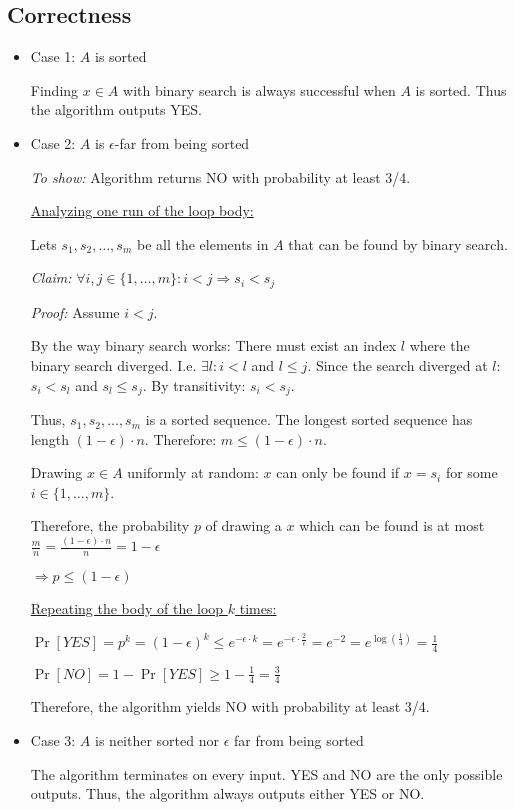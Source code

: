 \subsection*{Correctness}

\begin{itemize}
    \item Case 1: $A$ is sorted
    
    Finding $x \in A$ with binary search is always successful when $A$ is sorted. Thus the algorithm outputs YES. 
    
    \item Case 2: $A$ is $\epsilon$-far from being sorted
    
    \textit{To show:}  Algorithm returns NO with probability at least 3/4. 
    
    \underline{Analyzing one run of the loop body:}
        
    Lets $s_1, s_2,\dots,s_m$ be all the elements in $A$ that can be found by binary search.
    
    \textit{Claim:} $\forall i,j \in \{1,\dots,m\} : i < j \Rightarrow s_i < s_j$
    
    \textit{Proof:} Assume  $i < j$.
    
    By the way binary search works: There must exist an index $l$ where the binary search diverged. I.e. $\exists l : i < l$ and $l \leq j$.
    Since the search diverged at $l$: $s_i < s_l$ and $s_l \leq s_j$. By transitivity: $s_i < s_j$.
    
    Thus, $s_1, s_2,\dots,s_m$ is a sorted sequence. The longest sorted sequence has length $(1 - \epsilon) \cdot n$. Therefore: $m \leq (1 - \epsilon) \cdot n$.
    
    Drawing $x \in A$ uniformly at random: $x$ can only be found if $x = s_i$ for some $i \in \{1,\dots,m\}$.
    
    Therefore, the probability $p$ of drawing a $x$ which can be found is at most $ \frac{m}{n} = \frac{(1 - \epsilon) \cdot n}{n} = 1 - \epsilon$ 
    
     $\Rightarrow p \leq (1 - \epsilon)$
    
    \underline{Repeating the body of the loop $k$ times:}
    
    $\Pr[\textit{YES}] 
    = p^k 
    = (1 - \epsilon)^{k} 
    \leq e^{-\epsilon \cdot k}
    = e^{-\epsilon \cdot \frac{2}{\epsilon}}
    = e^{-2}
    = e^{\log\left(\frac{1}{4}\right)}
    = \frac{1}{4}$
    
    $\Pr[\textit{NO}] = 1 - \Pr[\textit{YES}] \geq 1 - \frac{1}{4} = \frac{3}{4}$
    
    Therefore, the algorithm yields NO with probability at least 3/4.
    
    \item Case 3: $A$ is neither sorted nor $\epsilon$ far from being sorted
    
    The algorithm terminates on every input. YES and NO are the only possible outputs. 
    Thus, the algorithm always outputs either YES or NO.
\end{itemize}